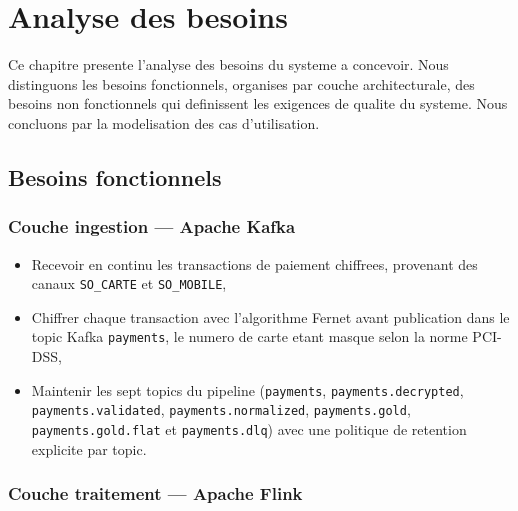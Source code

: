 \chapter{Analyse des besoins}
\label{chap:besoins}

\introchapitre

Ce chapitre presente l'analyse des besoins du systeme a concevoir. Nous distinguons
les besoins fonctionnels, organises par couche architecturale, des besoins non
fonctionnels qui definissent les exigences de qualite du systeme. Nous concluons par
la modelisation des cas d'utilisation.

\section{Besoins fonctionnels}
\label{sec:besoins-fonc}

\subsection{Couche ingestion --- Apache Kafka}

\begin{itemize}
    \item Recevoir en continu les transactions de paiement chiffrees, provenant des
    canaux \texttt{SO\_CARTE} et \texttt{SO\_MOBILE},
    \item Chiffrer chaque transaction avec l'algorithme Fernet avant publication dans
    le topic Kafka \texttt{payments}, le numero de carte etant masque selon la norme
    PCI-DSS,
    \item Maintenir les sept topics du pipeline (\texttt{payments},
    \texttt{payments.decrypted}, \texttt{payments.validated},
    \texttt{payments.normalized}, \texttt{payments.gold}, \texttt{payments.gold.flat}
    et \texttt{payments.dlq}) avec une politique de retention explicite par topic.
\end{itemize}

\subsection{Couche traitement --- Apache Flink}

